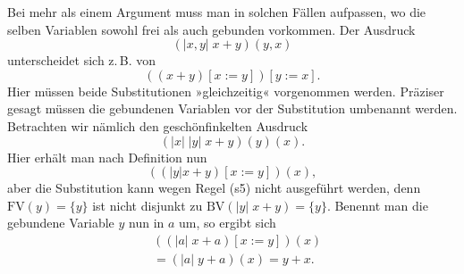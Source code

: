 \documentclass[a4paper,11pt,fleqn,twocolumn,twoside]{article}
\numberwithin{equation}{section}
\begin{document}
Bei mehr als einem Argument muss man in solchen Fällen aufpassen,
wo die selben Variablen sowohl frei als auch gebunden vorkommen.
Der Ausdruck
\begin{equation}
(|x,y|\; x+y)(y,x)
\end{equation}
unterscheidet sich z.\,B. von
\begin{equation}
((x+y)[x:=y])[y:=x].
\end{equation}
Hier müssen beide Substitutionen »gleichzeitig« vorgenommen werden.
Präziser gesagt müssen die gebundenen Variablen vor der Substitution
umbenannt werden. Betrachten wir nämlich den geschönfinkelten
Ausdruck
\begin{equation}
(|x|\;|y|\;x+y)(y)(x).
\end{equation}
Hier erhält man nach Definition nun
\begin{equation}
((|y| x+y)[x:=y])(x),
\end{equation}
aber die Substitution kann wegen Regel (s5) nicht ausgeführt
werden, denn $\mathrm{FV}(y)=\{y\}$ ist nicht disjunkt zu
$\mathrm{BV}(|y|\;x+y)=\{y\}$. Benennt man die gebundene Variable
$y$ nun in $a$ um, so ergibt sich
\begin{equation}
\begin{split}
&((|a|\;x+a)[x:=y])(x)\\
&= (|a|\;y+a)(x) = y+x.
\end{split}
\end{equation}
\end{document}

